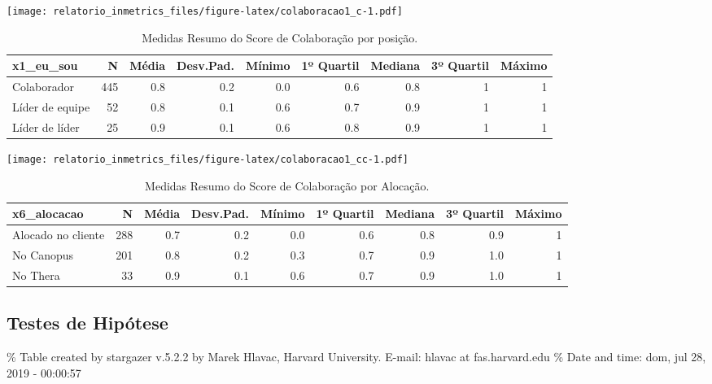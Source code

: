 \documentclass[]{book}
\begin{document}
\texttt{[image: relatorio\_inmetrics\_files/figure-latex/colaboracao1\_c-1.pdf]}

\begin{table}[t]

\caption{\label{tab:unnamed-chunk-28}Medidas Resumo do Score de Colaboração por posição.}
\centering
\fontsize{7}{9}\selectfont
\begin{tabular}{lrrrrrrrr}
\toprule
x1\_eu\_sou & N & Média & Desv.Pad. & Mínimo & 1º Quartil & Mediana & 3º Quartil & Máximo\\
\midrule
Colaborador & 445 & 0.8 & 0.2 & 0.0 & 0.6 & 0.8 & 1 & 1\\
Líder de equipe & 52 & 0.8 & 0.1 & 0.6 & 0.7 & 0.9 & 1 & 1\\
Líder de líder & 25 & 0.9 & 0.1 & 0.6 & 0.8 & 0.9 & 1 & 1\\
\bottomrule
\end{tabular}
\end{table}

\texttt{[image: relatorio\_inmetrics\_files/figure-latex/colaboracao1\_cc-1.pdf]}

\begin{table}[t]

\caption{\label{tab:unnamed-chunk-29}Medidas Resumo do Score de Colaboração por Alocação.}
\centering
\fontsize{7}{9}\selectfont
\begin{tabular}{lrrrrrrrr}
\toprule
x6\_alocacao & N & Média & Desv.Pad. & Mínimo & 1º Quartil & Mediana & 3º Quartil & Máximo\\
\midrule
Alocado no cliente & 288 & 0.7 & 0.2 & 0.0 & 0.6 & 0.8 & 0.9 & 1\\
No Canopus & 201 & 0.8 & 0.2 & 0.3 & 0.7 & 0.9 & 1.0 & 1\\
No Thera & 33 & 0.9 & 0.1 & 0.6 & 0.7 & 0.9 & 1.0 & 1\\
\bottomrule
\end{tabular}
\end{table}

\pagebreak

\hypertarget{testes-de-hipotese-10}{%
\subsection{Testes de Hipótese}\label{testes-de-hipotese-10}}

\% Table created by stargazer v.5.2.2 by Marek Hlavac, Harvard University. E-mail: hlavac at fas.harvard.edu
\% Date and time: dom, jul 28, 2019 - 00:00:57
\end{document}
